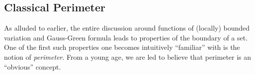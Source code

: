\documentclass[../main.tex]{subfiles}
\begin{document}
%
%
%    
%
%

\subsection{Classical Perimeter}\label{sec:perimeter}

As alluded to earlier, the entire discussion around functions of (locally) bounded variation and Gauss-Green formula leads to properties of the boundary of a set. One of the first such properties one becomes intuitively ``familiar'' with is the notion of \textit{perimeter}. From a young age, we are led to believe that perimeter is an ``obvious'' concept.
\end{document}
